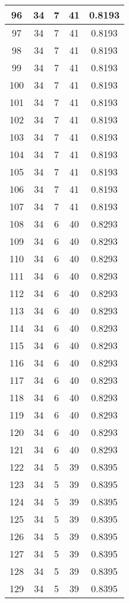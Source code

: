 \documentclass[letterpaper, 12pt]{article}
\begin{document}
\begin{longtable}{|c|c|c|c|c|}
\hline
96 & 34 & 7 & 41 & 0.8193 \\
\hline
97 & 34 & 7 & 41 & 0.8193 \\
\hline
98 & 34 & 7 & 41 & 0.8193 \\
\hline
99 & 34 & 7 & 41 & 0.8193 \\
\hline
100 & 34 & 7 & 41 & 0.8193 \\
\hline
101 & 34 & 7 & 41 & 0.8193 \\
\hline
102 & 34 & 7 & 41 & 0.8193 \\
\hline
103 & 34 & 7 & 41 & 0.8193 \\
\hline
104 & 34 & 7 & 41 & 0.8193 \\
\hline
105 & 34 & 7 & 41 & 0.8193 \\
\hline
106 & 34 & 7 & 41 & 0.8193 \\
\hline
107 & 34 & 7 & 41 & 0.8193 \\
\hline
108 & 34 & 6 & 40 & 0.8293 \\
\hline
109 & 34 & 6 & 40 & 0.8293 \\
\hline
110 & 34 & 6 & 40 & 0.8293 \\
\hline
111 & 34 & 6 & 40 & 0.8293 \\
\hline
112 & 34 & 6 & 40 & 0.8293 \\
\hline
113 & 34 & 6 & 40 & 0.8293 \\
\hline
114 & 34 & 6 & 40 & 0.8293 \\
\hline
115 & 34 & 6 & 40 & 0.8293 \\
\hline
116 & 34 & 6 & 40 & 0.8293 \\
\hline
117 & 34 & 6 & 40 & 0.8293 \\
\hline
118 & 34 & 6 & 40 & 0.8293 \\
\hline
119 & 34 & 6 & 40 & 0.8293 \\
\hline
120 & 34 & 6 & 40 & 0.8293 \\
\hline
121 & 34 & 6 & 40 & 0.8293 \\
\hline
122 & 34 & 5 & 39 & 0.8395 \\
\hline
123 & 34 & 5 & 39 & 0.8395 \\
\hline
124 & 34 & 5 & 39 & 0.8395 \\
\hline
125 & 34 & 5 & 39 & 0.8395 \\
\hline
126 & 34 & 5 & 39 & 0.8395 \\
\hline
127 & 34 & 5 & 39 & 0.8395 \\
\hline
128 & 34 & 5 & 39 & 0.8395 \\
\hline
129 & 34 & 5 & 39 & 0.8395 \\

\end{longtable}
\end{document}
